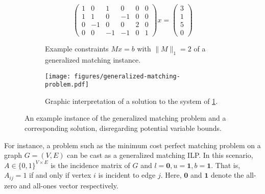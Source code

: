 \documentclass[a4paper,UKenglish,cleveref,thm-restate]{lipics-v2021}
\makeatletter
\newcommand{\veczero}{\mathbf0}
\newcommand{\vecone}{\mathbf1}
\newenvironment{cdisplaymath}{\@fleqnfalse\begin{displaymath}}{\end{displaymath}}
\makeatother
\begin{document}
\begin{figure}
    \begin{subfigure}{0.45\textwidth}
        \begin{cdisplaymath}
            \begin{pmatrix}
                1&0&1&0&0&0\\
                1&1&0&-1&0&0\\
                0&-1&0&0&2&0\\
                0&0&-1&-1&0&1
            \end{pmatrix}
            x=
            \begin{pmatrix}
                3\\
                1\\
                5\\
                0
            \end{pmatrix}
        \end{cdisplaymath}
        \caption{Example constraints $Mx=b$ with $\|M\|_1=2$ of a generalized matching instance.}
        \label{fig:example-generalized-matching-instance-system}
    \end{subfigure}
    \hspace{0.05\textwidth}
    \begin{subfigure}{0.45\textwidth}
        \centering
        \texttt{[image: figures/generalized-matching-problem.pdf]}
        \caption{Graphic interpretation of a solution to the system of \cref{fig:example-generalized-matching-instance-system}.}
    \end{subfigure}
    \caption{An example instance of the generalized matching problem and a corresponding solution, disregarding potential variable bounds.}
    \label{fig:example-generalized-matching-instance}
\end{figure}
For instance, a problem such as the minimum cost perfect matching problem on a graph $G=(V,E)$ can be cast as a generalized matching ILP. In this scenario, $A\in\{0,1\}^{V\times E}$ is the incidence matrix of $G$ and $l=\veczero,u=\vecone,b=\vecone$. That is, $A_{ij}=1$ if and only if vertex $i$ is incident to edge $j$. Here, $\veczero$ and $\vecone$ denote the all-zero and all-ones vector respectively.
\end{document}
